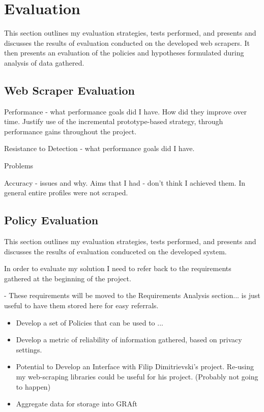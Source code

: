 \chapter{Evaluation}\label{C:us}

This section outlines my evaluation strategies, tests performed, and presents and discusses the results of evaluation conducted on the developed web scrapers. It then presents an evaluation of the policies and hypotheses formulated during analysis of data gathered. 

\section{Web Scraper Evaluation}

Performance - what performance goals did I have. How did they improve over time. Justify use of the incremental prototype-based strategy, through performance gains throughout the project.

Resistance to Detection - what performance goals did I have.

Problems

Accuracy - issues and why. Aims that I had - don't think I achieved them. In general entire profiles were not scraped. 








\section{Policy Evaluation}

This section outlines my evaluation strategies, tests performed, and presents and discusses the results of evaluation conduceted on the developed system. 

In order to evaluate my solution I need to refer back to the requirements gathered at the beginning of the project. 

- These requirements will be moved to the Requirements Analysis section... is just useful to have them stored here for easy referrals. 

\begin{itemize}
\item Develop a set of Policies that can be used to ...
\item Develop a metric of reliability of information gathered, based on privacy settings.
\item Potential to Develop an Interface with Filip Dimitrievski's project. Re-using my web-scraping libraries could be useful for his project. (Probably not going to happen)
\item Aggregate data for storage into GRAft
\end{itemize}

